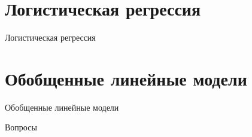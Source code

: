 \documentclass[10pt]{beamer}
\begin{document}

\section{Логистическая регрессия}


\begin{frame}{}

\begin{center}
\Large Логистическая регрессия
\end{center}

\end{frame}


\section{Обобщенные линейные модели}


\begin{frame}{}

\begin{center}
\Large Обобщенные линейные модели
\end{center}

\end{frame}

\begin{frame}{}

\begin{center}
\Large Вопросы
\end{center}

\end{frame}
\end{document}
